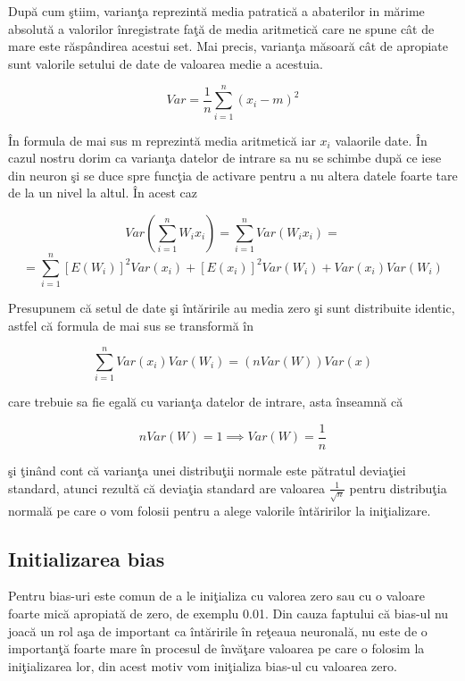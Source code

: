 \par 

Dup\u{a} cum \c{s}tiim, varian\c{t}a reprezint\u{a} media patratic\u{a} a abaterilor in m\u{a}rime absolut\u{a} a valorilor \^{i}nregistrate fa\c{t}\u{a} de media aritmetic\u{a} care ne spune c\^{a}t de mare este r\u{a}sp\^{a}ndirea  acestui set. Mai precis, varian\c{t}a m\u{a}soar\u{a} c\^{a}t de apropiate sunt valorile setului de date de valoarea medie a acestuia.

$$Var = \frac{1}{n} \sum_{i=1}^{n} (x_i - m )^2 $$

\^{I}n formula de mai sus m reprezint\u{a} media aritmetic\u{a} iar $x_i$ valaorile date. \^{I}n cazul nostru dorim ca varian\c{t}a datelor de intrare sa nu se schimbe dup\u{a} ce iese din neuron \c{s}i se duce spre func\c{t}ia de activare pentru a nu altera datele foarte tare de la un nivel la altul. \^{I}n acest caz

$$Var(\sum_{i=1}^{n} W_i x_i) = \sum_{i=1}^{n} Var(W_i x_i) = $$
$$ = \sum_{i=1}^{n} [E(W_i)]^2 Var(x_i) + [E(x_i)]^2 Var(W_i) + Var(x_i) Var(W_i)$$

Presupunem c\u{a} setul de date \c{s}i \^{i}nt\u{a}ririle au media zero \c{s}i sunt distribuite identic, astfel c\u{a} formula de mai sus se transform\u{a} \^{i}n

$$\sum_{i=1}^{n} Var(x_i) Var(W_i) = (n Var(W)) Var(x)$$

care trebuie sa fie egal\u{a} cu varian\c{t}a datelor de intrare, asta \^{i}nseamn\u{a} c\u{a} 

$$n Var(W) = 1 \implies Var(W) =  \frac{1}{n} $$

\c{s}i \c{t}in\^{a}nd cont c\u{a} varian\c{t}a unei distribu\c{t}ii normale este p\u{a}tratul devia\c{t}iei standard, atunci rezult\u{a} c\u{a} devia\c{t}ia standard are valoarea $\frac{1}{\sqrt{n}}$ pentru distribu\c{t}ia normal\u{a} pe care o vom folosii pentru a alege valorile \^{i}nt\u{a}ririlor la ini\c{t}ializare.

\subsection{Initializarea bias}

Pentru bias-uri este comun de a le ini\c{t}ializa cu valorea zero sau cu o valoare foarte mic\u{a} apropiat\u{a} de zero, de exemplu 0.01. Din cauza faptului c\u{a} bias-ul nu joac\u{a} un rol a\c{s}a de important ca \^{i}nt\u{a}ririle \^{i}n re\c{t}eaua neuronal\u{a}, nu este de o importan\c{t}\u{a} foarte mare \^{i}n procesul de \^{i}nv\u{a}\c{t}are valoarea pe care o folosim la ini\c{t}ializarea lor, din acest motiv vom ini\c{t}ializa bias-ul cu valoarea zero.

